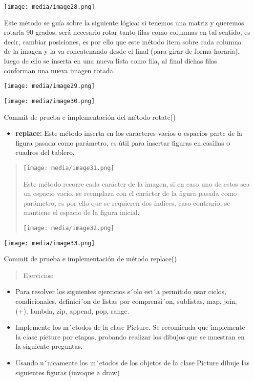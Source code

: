 \documentclass[
]{article}
\begin{document}
\texttt{[image: media/image28.png]}

Este método se guía sobre la siguiente lógica: si tenemos una matriz y
queremos rotarla 90 grados, será necesario rotar tanto filas como
columnas en tal sentido, es decir, cambiar posiciones, es por ello que
este método itera sobre cada columna de la imagen y la va concatenando
desde el final (para girar de forma horaria), luego de ello se inserta
en una nueva lista como fila, al final dichas filas conforman una nueva
imagen rotada.

\texttt{[image: media/image29.png]}

\texttt{[image: media/image30.png]}

Commit de prueba e implementación del método rotate()

\begin{itemize}
\item
  \textbf{replace:} Este método inserta en los caracteres vacíos o
  espacios parte de la figura pasada como parámetro, es útil para
  insertar figuras en casillas o cuadros del tablero.
\end{itemize}

\begin{quote}
\texttt{[image: media/image31.png]}

Este método recorre cada carácter de la imagen, si en caso uno de estos
sea un espacio vacío, se reemplaza con el carácter de la figura pasada
como parámetro, es por ello que se requieren dos índices, caso
contrario, se mantiene el espacio de la figura inicial.

\texttt{[image: media/image32.png]}
\end{quote}

\texttt{[image: media/image33.png]}

Commit de prueba e implementación de método replace()

\begin{quote}
Ejercicios:
\end{quote}

\begin{itemize}
\item
  Para resolver los siguientes ejercicios s´olo est´a permitido usar
  ciclos, condicionales, definici´on de listas por comprensi´on,
  sublistas, map, join, (+), lambda, zip, append, pop, range.
\item
  Implemente los m´etodos de la clase Picture. Se recomienda que
  implemente la clase picture por etapas, probando realizar los dibujos
  que se muestran en la siguiente preguntas.
\item
  Usando u´nicamente los m´etodos de los objetos de la clase Picture
  dibuje las siguientes figuras (invoque a draw)
\end{itemize}
\end{document}
